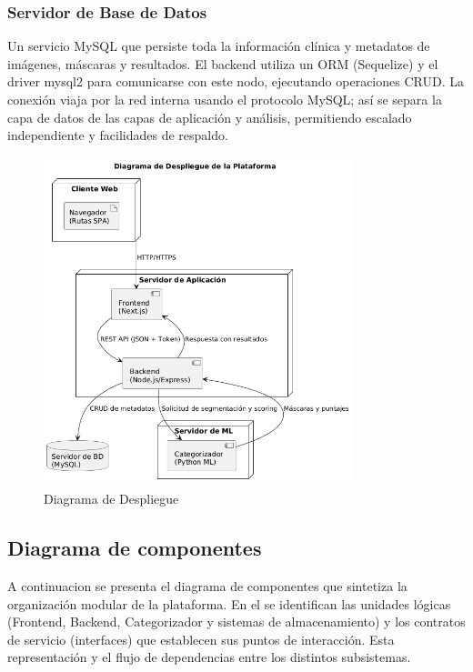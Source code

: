 \subsubsection{Servidor de Base de Datos}
Un servicio MySQL que persiste toda la información clínica y metadatos de imágenes, máscaras y resultados. El backend utiliza un ORM (Sequelize) y el driver mysql2 para comunicarse con este nodo, ejecutando operaciones CRUD. La conexión viaja por la red interna usando el protocolo MySQL; así se separa la capa de datos de las capas de aplicación y análisis, permitiendo escalado independiente y facilidades de respaldo.

\begin{figure}[H]
    \centering
    \includegraphics[width=0.8\textwidth,height=0.5\textheight,keepaspectratio]{imagenes/despliegue.png}
    \caption{Diagrama de Despliegue}
    \label{fig:DD}
\end{figure}


\subsection{Diagrama de componentes}
\label{ssc:diaComp}

A continuacion se presenta el diagrama de componentes que sintetiza la organización modular de la plataforma. En el se identifican las unidades lógicas (Frontend, Backend, Categorizador y sistemas de almacenamiento) y los contratos de servicio (interfaces) que establecen sus puntos de interacción. Esta representación y el flujo de dependencias entre los distintos subsistemas.


